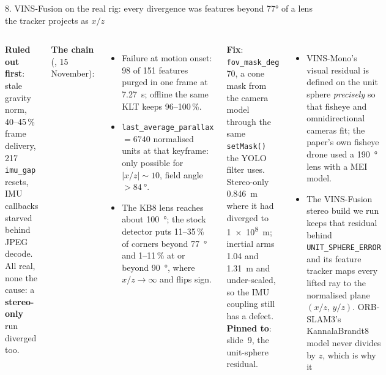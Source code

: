 \documentclass[11pt,aspectratio=169]{beamer}
\newcommand{\repo}[1]{\texttt{\detokenize{#1}}}
\begin{document}
\begin{frame}{8. VINS-Fusion on the real rig: every divergence was features beyond 77° of a lens the tracker projects as $x/z$}
  \begin{columns}[T]
      \scriptsize
      \textbf{Ruled out first}: stale gravity norm, 40--45\,\% frame delivery,
      217 \texttt{imu\_gap} resets, IMU callbacks starved behind JPEG decode.
      All real, none the cause: a \textbf{stereo-only} run diverged too.
      \par\vspace{0.3em}
      \textbf{The chain} (\repo{realv7_001}, 15 November):
      \begin{itemize}
        \item Failure at motion onset: 98 of 151 features purged in one frame
              at \SI{7.27}{\second}; offline the same KLT keeps 96--100\,\%.
        \item \texttt{last\_average\_parallax} $=6740$ normalised units at that
              keyframe: only possible for $|x/z|\sim 10$, field angle
              $>\SI{84}{\degree}$.
        \item The KB8 lens reaches about \SI{100}{\degree}; the stock detector
              puts 11--35\,\% of corners beyond \SI{77}{\degree} and 1--11\,\%
              at or beyond \SI{90}{\degree}, where $x/z\to\infty$ and flips sign.
      \end{itemize}
      \textbf{Fix}: \texttt{fov\_mask\_deg} 70, a cone mask from the camera
      model through the same \texttt{setMask()} the YOLO filter uses. Stereo-only
      \SI{0.846}{\metre} where it had diverged to \SI{1e8}{\metre}; inertial
      arms 1.04 and \SI{1.31}{\metre} and under-scaled, so the IMU coupling
      still has a defect.
      \scriptsize
      \textbf{Pinned to}: slide~9, the unit-sphere residual.
      \begin{itemize}
        \item VINS-Mono's visual residual is defined on the unit sphere
              \emph{precisely} so that fisheye and omnidirectional cameras
              fit; the paper's own fisheye drone used a \SI{190}{\degree} lens
              with a MEI model.
        \item The VINS-Fusion stereo build we run keeps that residual behind
              \texttt{UNIT\_SPHERE\_ERROR} and its feature tracker maps every
              lifted ray to the normalised plane $(x/z,\,y/z)$. ORB-SLAM3's
              KannalaBrandt8 model never divides by $z$, which is why it

\end{itemize}
\end{columns}
\end{frame}
\end{document}
